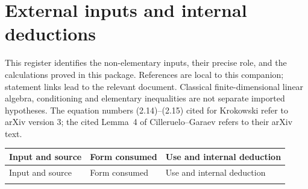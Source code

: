 \section*{External inputs and internal deductions}
This register identifies the non-elementary inputs, their precise role,
and the calculations proved in this package. References are local to this
companion; statement links lead to the relevant document. Classical
finite-dimensional linear algebra, conditioning and elementary inequalities
are not separate imported hypotheses.
The equation numbers (2.14)--(2.15) cited for Krokowski refer to arXiv version 3;
the cited Lemma~4 of Cilleruelo--Garaev refers to their arXiv text.

\begingroup
\small
\renewcommand{\arraystretch}{1.16}
\begin{longtable}{@{}L{.205\textwidth}L{.30\textwidth}L{.435\textwidth}@{}}
\toprule
Input and source & Form consumed & Use and internal deduction\\\midrule
\endfirsthead
\toprule Input and source & Form consumed & Use and internal deduction\\\midrule
\endhead
\bottomrule\endfoot


\end{longtable}
